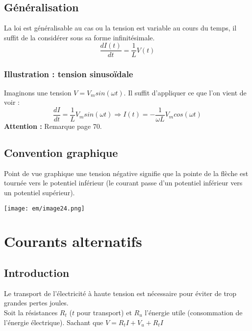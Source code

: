 \documentclass[british,french,11pt, a4paper, openany]{book}
\begin{document}
\subsection{Généralisation}
La loi est généralisable au cas ou la tension est variable au cours du temps, il suffit de la considérer sous sa forme infinitésimale.
\begin{equation}
	\frac{dI(t)}{dt} = \frac{1}{L}V(t)
\end{equation}

\subsubsection*{Illustration : tension sinusoïdale}
Imaginons une tension $V = V_m sin(\omega t)$. Il suffit d'appliquer ce que l'on vient de voir : 
\begin{equation}
	\frac{dI}{dt} = \frac{1}{L}V_m sin(\omega t) \Rightarrow I(t) = -\frac{1}{\omega L}V_m cos(\omega t)
\end{equation}
\textbf{Attention :} Remarque page 70.
\subsection{Convention graphique}
Point
de vue graphique une tension négative signifie que la pointe de la flèche est tournée
vers le potentiel inférieur (le courant passe d’un potentiel inférieur vers un potentiel
supérieur).

\begin{center}
	\texttt{[image: em/image24.png]}\\
\end{center}

\section{Courants alternatifs}
\subsection{Introduction}
Le transport de l'électricité à haute tension est nécessaire pour éviter de trop grandes pertes joules.\\
Soit la résistances $R_t$ ($t$ pour transport) et $R_u$ l'énergie utile (consommation de l'énergie électrique). Sachant que $V = R_tI + V_u + R_tI$
\end{document}
